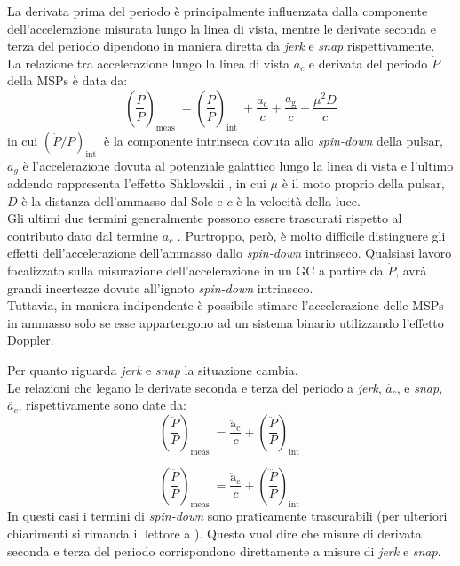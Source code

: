 La derivata prima del periodo è principalmente influenzata dalla componente dell'accelerazione misurata lungo la linea di vista, mentre le derivate seconda e terza del periodo dipendono in maniera diretta da \textit{jerk} e \textit{snap} rispettivamente.\\
La relazione tra accelerazione lungo la linea di vista $a_{c}$ e derivata del periodo $\dot{P}$ della MSPs è data da:
\begin{equation}
\left(\frac{\dot{P}}{P}\right)_{\text {meas }}=\left(\frac{\dot{P}}{P}\right)_{\text {int }}+\frac{a_{\mathrm{c}}}{c}+\frac{a_{\mathrm{g}}}{c}+\frac{\mu^{2} D}{c}
\label{eq:ac_ppunto}
\end{equation}
in cui $(\dot{P} / P)_{\text {int }}$ è la componente intrinseca dovuta allo \textit{spin-down} della pulsar, $a_{g}$ è l'accelerazione dovuta al potenziale galattico lungo la linea di vista e l'ultimo addendo rappresenta l'effetto Shklovskii \cite{shklov:paper}, in cui $\mu$ è il moto proprio della pulsar, $D$ è la distanza dell'ammasso dal Sole e $c$ è la velocità della luce.\\
Gli ultimi due termini generalmente possono essere trascurati rispetto al contributo dato dal termine $a_{c}$ \cite{abbate:paper}. Purtroppo, però, è molto difficile distinguere gli effetti dell'accelerazione dell'ammasso dallo \textit{spin-down} intrinseco. Qualsiasi lavoro focalizzato sulla misurazione dell'accelerazione in un GC a partire da $\dot{P}$, avrà grandi incertezze dovute all'ignoto \textit{spin-down} intrinseco.\\
Tuttavia, in maniera indipendente è possibile stimare l'accelerazione delle MSPs in ammasso solo se esse appartengono ad un sistema binario utilizzando l'effetto Doppler.

Per quanto riguarda \textit{jerk} e \textit{snap} la situazione cambia.\\ 
Le relazioni che legano le derivate seconda e terza del periodo a \textit{jerk}, $\dot{a_{c}}$, e \textit{snap}, $\ddot{a_{c}}$, rispettivamente sono date da:
\begin{equation}
\left(\frac{\ddot{P}}{P}\right)_{\text {meas }}=\frac{\ddot{\mathrm{a}}_{\mathrm{c}}}{c}+\left(\frac{\ddot{P}}{P}\right)_{\text {int }}
\label{eq:jerk_p}
\end{equation}

\begin{equation}
\left(\frac{\dddot{P}}{P}\right)_{\text {meas }}=\frac{\ddot{\mathrm{a}}_{\mathrm{c}}}{c}+\left(\frac{\dddot{P}}{P}\right)_{\text {int }}
\label{eq:snap_p}
\end{equation}
In questi casi i termini di \textit{spin-down} sono praticamente trascurabili (per ulteriori chiarimenti si rimanda il lettore a \cite{abbate1:paper}). Questo vuol dire che misure di derivata seconda e terza del periodo corrispondono direttamente a misure di \textit{jerk} e \textit{snap}.


